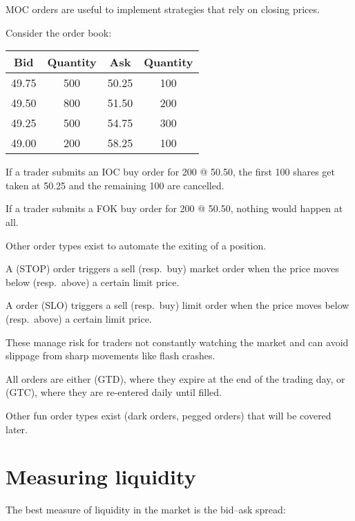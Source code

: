 \documentclass[class=bu430,notes,tikz]{agony}
\begin{document}
MOC orders are useful to implement strategies that rely on closing prices.

Consider the order book:
\begin{center}
  \begin{tabular}{cc||cc}
    Bid   & Quantity & Ask   & Quantity \\ \hline
    49.75 & 500      & 50.25 & 100      \\
    49.50 & 800      & 51.50 & 200      \\
    49.25 & 500      & 54.75 & 300      \\
    49.00 & 200      & 58.25 & 100
  \end{tabular}
\end{center}
If a trader submits an IOC buy order for 200 @ 50.50,
the first 100 shares get taken at 50.25 and the remaining 100 are cancelled.

If a trader submits a FOK buy order for 200 @ 50.50, nothing would happen at all.

Other order types exist to automate the exiting of a position.

\begin{defn}
  A  (STOP) order triggers a sell (resp.\ buy)
  market order when the price moves below (resp.\ above) a certain limit price.

  A  order (SLO) triggers a sell (resp.\ buy)
  limit order when the price moves below (resp.\ above) a certain limit price.
\end{defn}

These manage risk for traders not constantly watching the market
and can avoid slippage from sharp movements like flash crashes.

\begin{defn}
  All orders are either  (GTD),
  where they expire at the end of the trading day,
  or  (GTC),
  where they are re-entered daily until filled.
\end{defn}

Other fun order types exist (dark orders, pegged orders) that will be covered later.

\section{Measuring liquidity}

The best measure of liquidity in the market is the bid--ask spread:
\end{document}
